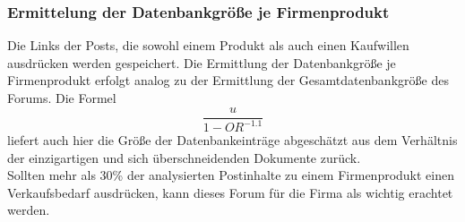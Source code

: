 \subsubsection{Ermittelung der Datenbankgröße je Firmenprodukt}
Die Links der Posts, die sowohl einem Produkt als auch einen Kaufwillen ausdrücken werden gespeichert. Die Ermittlung der Datenbankgröße je Firmenprodukt erfolgt analog zu der Ermittlung der Gesamtdatenbankgröße des Forums. Die Formel \[\frac{u}{1-OR^{-1.1}}\] \cite{lu2008efficient} liefert auch hier die Größe der Datenbankeinträge abgeschätzt aus dem Verhältnis der einzigartigen und sich überschneidenden Dokumente zurück.\\
Sollten mehr als 30\% der analysierten Postinhalte zu einem Firmenprodukt einen Verkaufsbedarf ausdrücken, kann dieses Forum für die Firma als wichtig erachtet werden.
